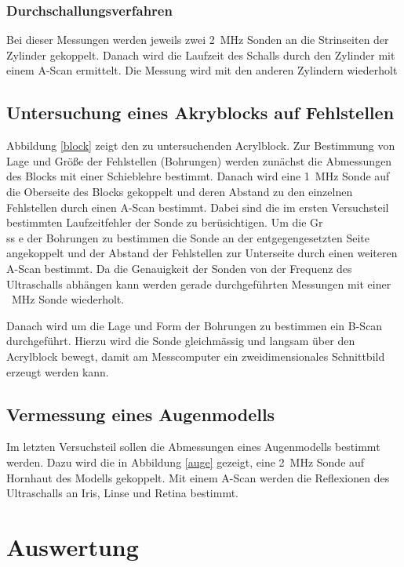 \documentclass[11pt,ngerman,a4paper]{article}
\begin{document}
\subsubsection{Durchschallungsverfahren}
Bei dieser Messungen werden jeweils zwei \SI{2}{\mega\hertz} Sonden an die Strinseiten der Zylinder gekoppelt. Danach wird die Laufzeit des Schalls durch den Zylinder mit einem A-Scan ermittelt. Die Messung wird mit den anderen Zylindern wiederholt
\subsection{Untersuchung eines Akryblocks auf Fehlstellen}
Abbildung \ref{block} zeigt den zu untersuchenden Acrylblock. Zur Bestimmung von Lage und Gr\"o\ss e der Fehlstellen (Bohrungen) werden zun\"achst die Abmessungen des Blocks mit einer Schieblehre bestimmt. Danach wird eine \SI{1}{\mega\hertz} Sonde auf die Oberseite des Blocks gekoppelt und deren Abstand zu den einzelnen Fehlstellen durch einen A-Scan bestimmt. Dabei sind die im ersten Versuchsteil bestimmten Laufzeitfehler der Sonde zu ber\"usichtigen. Um die Gr\"\\ss e der Bohrungen zu bestimmen die Sonde an der entgegengesetzten Seite angekoppelt und der Abstand der Fehlstellen zur Unterseite durch einen weiteren A-Scan bestimmt. Da die Genauigkeit der Sonden von der Frequenz des Ultraschalls abh\"angen kann werden gerade durchgef\"uhrten Messungen mit einer \SI{}{\mega\hertz} Sonde wiederholt. 

\noindent
Danach wird um die Lage und Form der Bohrungen zu bestimmen ein B-Scan durchgef\"uhrt. Hierzu wird die Sonde gleichm\"assig und langsam \"uber den Acrylblock bewegt, damit am Messcomputer ein zweidimensionales Schnittbild erzeugt werden kann.

\subsection{Vermessung eines  Augenmodells}
Im letzten Versuchsteil sollen die Abmessungen eines Augenmodells bestimmt werden. Dazu wird die in Abbildung \ref{auge} gezeigt, eine \SI{2}{\mega\hertz} Sonde auf Hornhaut des Modells gekoppelt. Mit einem A-Scan werden die Reflexionen des Ultraschalls an Iris, Linse und Retina bestimmt.
\section{Auswertung}
\end{document}

